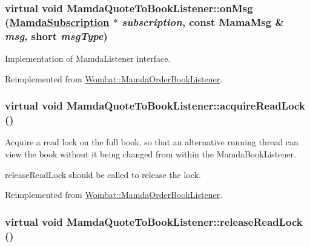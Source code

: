 \hypertarget{classMamdaQuoteToBookListener_2d57ca85affe2614497a207122ae6193}{
\subsubsection[onMsg]{\setlength{\rightskip}{0pt plus 5cm}virtual void Mamda\-Quote\-To\-Book\-Listener::on\-Msg (\hyperlink{classWombat_1_1MamdaSubscription}{Mamda\-Subscription} $\ast$ {\em subscription}, const Mama\-Msg \& {\em msg}, short {\em msg\-Type})}}
\label{classMamdaQuoteToBookListener_2d57ca85affe2614497a207122ae6193}


Implementation of Mamda\-Listener interface. 



Reimplemented from \hyperlink{classWombat_1_1MamdaOrderBookListener_25b4001c57c2a140040baad9f84bbec4}{Wombat::Mamda\-Order\-Book\-Listener}.\hypertarget{classMamdaQuoteToBookListener_b3aaeea876237a3869a4380c6d12c409}{
\subsubsection[acquireReadLock]{\setlength{\rightskip}{0pt plus 5cm}virtual void Mamda\-Quote\-To\-Book\-Listener::acquire\-Read\-Lock ()}}
\label{classMamdaQuoteToBookListener_b3aaeea876237a3869a4380c6d12c409}


Acquire a read lock on the full book, so that an alternative running thread can view the book without it being changed from within the Mamda\-Book\-Listener. 

release\-Read\-Lock should be called to release the lock. 

Reimplemented from \hyperlink{classWombat_1_1MamdaOrderBookListener_c049e9bab85f8db59adafeddee15e23e}{Wombat::Mamda\-Order\-Book\-Listener}.\hypertarget{classMamdaQuoteToBookListener_04933309e7df1a0afd2aa8d173e20c7c}{
\subsubsection[releaseReadLock]{\setlength{\rightskip}{0pt plus 5cm}virtual void Mamda\-Quote\-To\-Book\-Listener::release\-Read\-Lock ()}}
\label{classMamdaQuoteToBookListener_04933309e7df1a0afd2aa8d173e20c7c}


